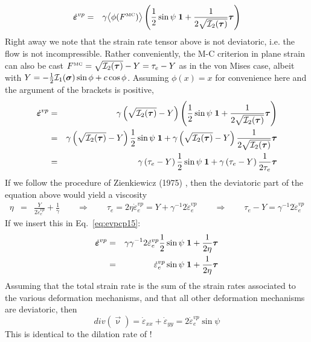 \begin{eqnarray}
\dot{\bm \varepsilon}^{vp} 
&=& \gamma \big\langle \phi( F^{\text{\tiny MC}} )  \big\rangle 
\left(\frac12 \sin\psi \;  {\bm 1} + \frac{1}{2 \sqrt{{\cal I}_2(\bm \tau)}} {\bm \tau} \right)
\end{eqnarray}
Right away we note that the strain rate tensor above is not deviatoric, i.e. the flow
is not incompressible.
Rather conveniently, the M-C criterion in plane strain can also 
be cast $F^{\text{\tiny MC}} = \sqrt{{\cal I}_2(\bm \tau)} -Y = \tau_e - Y$ as in 
the von Mises case, albeit with 
$Y= -\frac12 {\cal I}_1(\bm\sigma) \sin\phi + c\cos\phi$.
Assuming $\phi(x)=x$ for convenience here and the argument of the brackets is positive, 
\begin{eqnarray}
\dot{\bm \varepsilon}^{vp} 
&=& \gamma \left(\sqrt{{\cal I}_2(\bm\tau)} - Y \right)
\left(\frac12 \sin\psi \;  {\bm 1} + \frac{1}{2 \sqrt{{\cal I}_2(\bm \tau)}} {\bm \tau} \right) \nonumber\\
&=& \gamma \left(\sqrt{{\cal I}_2(\bm\tau)} - Y \right)
\frac12 \sin\psi \;  {\bm 1} 
+  
\gamma \left(\sqrt{{\cal I}_2(\bm\tau)} - Y \right)
\frac{1}{2 \sqrt{{\cal I}_2(\bm \tau)}} {\bm \tau}  \nonumber\\
&=& \gamma \left(\tau_e - Y \right)
\frac12 \sin\psi \;  {\bm 1} 
+  
\gamma \left(\tau_e - Y \right)
\frac{1}{2 \tau_e} {\bm \tau}  \label{eq:evpcp15}
\end{eqnarray}
If we follow the procedure of Zienkiewicz (1975) , then the deviatoric part
of the equation above would yield a 
viscosity
\begin{eqnarray}
\eta 
&=& \frac{Y}{2  \dot\varepsilon_e^{vp}}
+ \frac{1 }{\gamma } 
\qquad \Rightarrow \qquad 
\tau_e = 2\eta \dot\varepsilon_e^{vp} = Y + \gamma^{-1} 2  \dot\varepsilon_e^{vp}
\qquad 
\Rightarrow
\qquad
\tau_e - Y = \gamma^{-1} 2  \dot\varepsilon_e^{vp}
\end{eqnarray}
If we insert this in Eq.~\eqref{eq:evpcp15}: 
\begin{eqnarray}
\dot{\bm \varepsilon}^{vp} 
&=& \gamma 
\gamma^{-1} 2  \dot\varepsilon_e^{vp}
\frac12 \sin\psi \;  {\bm 1} 
+  
\frac{1}{2\eta}
{\bm \tau}  \nonumber\\
&=& 
\dot\varepsilon_e^{vp}
\sin\psi \;  {\bm 1} 
+  
\frac{1}{2\eta}
{\bm \tau}  
\end{eqnarray}
Assuming that the total strain rate is the sum of the strain rates 
associated to the various deformation mechanisms, and that all
other deformation mechanisms are deviatoric, then 
\[
div (\vec\upnu)=
\dot{\varepsilon}_{xx}
+
\dot{\varepsilon}_{yy}
=
2  \dot\varepsilon_e^{vp}
\sin\psi 
\]
This 
is identical to the
dilation rate of \textcite{chpe15}!



